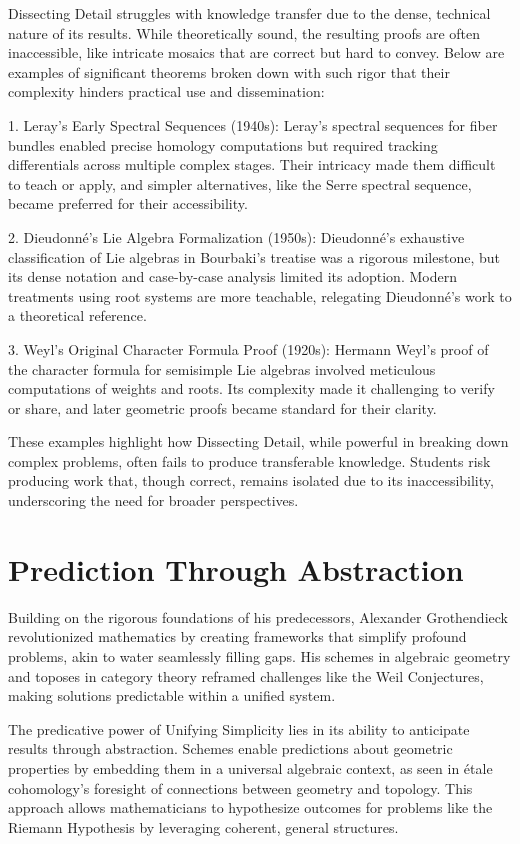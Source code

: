\documentclass{article}
\begin{document}
Dissecting Detail struggles with knowledge transfer due to the dense, technical nature of its results. While theoretically sound, the resulting proofs are often inaccessible, like intricate mosaics that are correct but hard to convey. Below are examples of significant theorems broken down with such rigor that their complexity hinders practical use and dissemination:

1. Leray’s Early Spectral Sequences (1940s): Leray’s spectral sequences for fiber bundles enabled precise homology computations but required tracking differentials across multiple complex stages. Their intricacy made them difficult to teach or apply, and simpler alternatives, like the Serre spectral sequence, became preferred for their accessibility.

2. Dieudonné’s Lie Algebra Formalization (1950s): Dieudonné’s exhaustive classification of Lie algebras in Bourbaki’s treatise was a rigorous milestone, but its dense notation and case-by-case analysis limited its adoption. Modern treatments using root systems are more teachable, relegating Dieudonné’s work to a theoretical reference.

3. Weyl’s Original Character Formula Proof (1920s): Hermann Weyl’s proof of the character formula for semisimple Lie algebras involved meticulous computations of weights and roots. Its complexity made it challenging to verify or share, and later geometric proofs became standard for their clarity.

These examples highlight how Dissecting Detail, while powerful in breaking down complex problems, often fails to produce transferable knowledge. Students risk producing work that, though correct, remains isolated due to its inaccessibility, underscoring the need for broader perspectives.

\section{Prediction Through Abstraction}
Building on the rigorous foundations of his predecessors, Alexander Grothendieck revolutionized mathematics by creating frameworks that simplify profound problems, akin to water seamlessly filling gaps. His schemes in algebraic geometry and toposes in category theory reframed challenges like the Weil Conjectures, making solutions predictable within a unified system.

The predicative power of Unifying Simplicity lies in its ability to anticipate results through abstraction. Schemes enable predictions about geometric properties by embedding them in a universal algebraic context, as seen in étale cohomology’s foresight of connections between geometry and topology. This approach allows mathematicians to hypothesize outcomes for problems like the Riemann Hypothesis by leveraging coherent, general structures.
\end{document}
